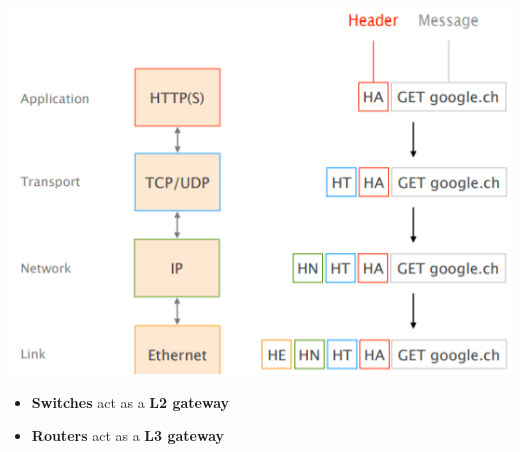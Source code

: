 \documentclass[a4paper, fontsize=8pt, landscape, DIV=1]{scrartcl}
\begin{document}
\begin{multicols*}{4}
				\includegraphics[width=\columnwidth]{images/Overview/header_adding.png}
				\begin{itemize}[noitemsep]
					\item \textbf{Switches} act as a \textbf{L2 gateway}
					\item \textbf{Routers} act as a \textbf{L3 gateway}
				\end{itemize}
			

\end{multicols*}
\end{document}
